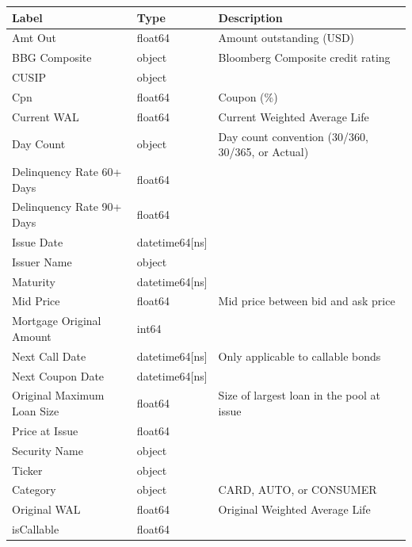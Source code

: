 \documentclass{article}
\begin{document}
\begin{table}[h]
  \small\centering
  \begin{floatrow}
   {\begin{tabular}{lll}
\toprule
Label &               Type  & Description \\
\midrule
Amt Out                    &         float64 & Amount outstanding (USD) \\
BBG Composite              &          object & Bloomberg Composite credit rating \\
CUSIP                      &          object & \\
Cpn                        &         float64 & Coupon (\%) \\
Current WAL                &         float64 & Current Weighted Average Life \\
Day Count                  &          object & Day count convention (30/360, 30/365, or Actual)\\
Delinquency Rate 60+ Days  &         float64 & \\
Delinquency Rate 90+ Days  &         float64 & \\
Issue Date                 &  datetime64[ns] & \\
Issuer Name                &          object & \\
Maturity                   &  datetime64[ns] & \\
Mid Price                  &         float64 & Mid price between bid and ask price \\
Mortgage Original Amount   &           int64 & \\
Next Call Date             &  datetime64[ns] & Only applicable to callable bonds \\
Next Coupon Date           &  datetime64[ns] & \\
Original Maximum Loan Size &         float64 & Size of largest loan in the pool at issue \\
Price at Issue             &         float64 & \\
Security Name              &          object & \\
Ticker                     &          object &\\
Category                   &          object & CARD, AUTO, or CONSUMER \\
Original WAL               &         float64 & Original Weighted Average Life \\
isCallable                 &         float64 & \\
\bottomrule
\end{tabular}}
  \end{floatrow}
\end{table}
\end{document}
